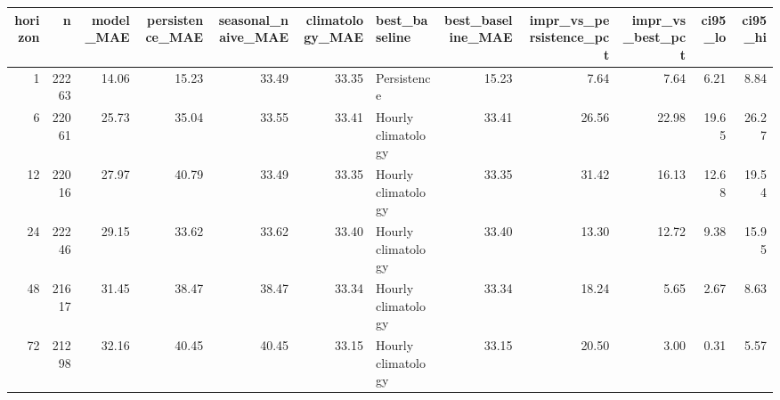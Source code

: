 \begin{tabular}{rrrrrrlrrrrr}
\toprule
horizon & n & model_MAE & persistence_MAE & seasonal_naive_MAE & climatology_MAE & best_baseline & best_baseline_MAE & impr_vs_persistence_pct & impr_vs_best_pct & ci95_lo & ci95_hi \\
\midrule
1 & 22263 & 14.06 & 15.23 & 33.49 & 33.35 & Persistence & 15.23 & 7.64 & 7.64 & 6.21 & 8.84 \\
6 & 22061 & 25.73 & 35.04 & 33.55 & 33.41 & Hourly climatology & 33.41 & 26.56 & 22.98 & 19.65 & 26.27 \\
12 & 22016 & 27.97 & 40.79 & 33.49 & 33.35 & Hourly climatology & 33.35 & 31.42 & 16.13 & 12.68 & 19.54 \\
24 & 22246 & 29.15 & 33.62 & 33.62 & 33.40 & Hourly climatology & 33.40 & 13.30 & 12.72 & 9.38 & 15.95 \\
48 & 21617 & 31.45 & 38.47 & 38.47 & 33.34 & Hourly climatology & 33.34 & 18.24 & 5.65 & 2.67 & 8.63 \\
72 & 21298 & 32.16 & 40.45 & 40.45 & 33.15 & Hourly climatology & 33.15 & 20.50 & 3.00 & 0.31 & 5.57 \\
\bottomrule
\end{tabular}

